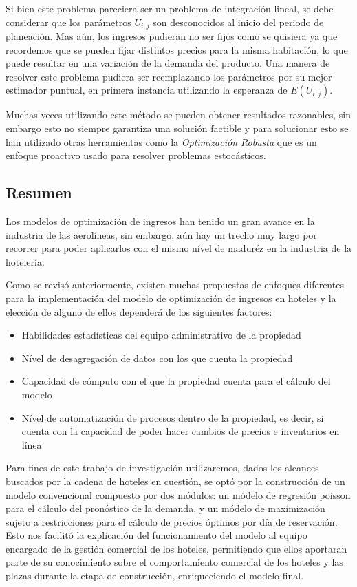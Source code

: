 {{{{{Si bien este problema pareciera ser un problema de integración lineal, se debe considerar que los parámetros $U_{i,j}$ son desconocidos al inicio del periodo de planeación. Mas aún, los ingresos pudieran no ser fijos como se quisiera ya que recordemos que se pueden fijar distintos precios para la misma habitación, lo que puede resultar en una variación de la demanda del producto. Una manera de resolver este problema pudiera ser reemplazando los parámetros por su mejor estimador puntual, en primera instancia utilizando la esperanza de $E(U_{i,j})$.

Muchas veces utilizando este método se pueden obtener resultados razonables, sin embargo esto no siempre garantiza una solución factible y para solucionar esto se han utilizado otras herramientas como la \emph{Optimización Robusta} que es un enfoque proactivo usado para resolver problemas estocásticos.

\subsection*{Resumen}

Los modelos de optimización de ingresos han tenido un gran avance en la industria de las aerolíneas, sin embargo, aún hay un trecho muy largo por recorrer para poder aplicarlos con el mismo nível de maduréz en la industria de la hotelería.

Como se revisó anteriormente, existen muchas propuestas de enfoques diferentes para la implementación del modelo de optimización de ingresos en hoteles y la elección de alguno de ellos dependerá de los siguientes factores:

\begin{itemize}
  \item Habilidades estadísticas del equipo administrativo de la propiedad
  \item Nível de desagregación de datos con los que cuenta la propiedad
  \item Capacidad de cómputo con el que la propiedad cuenta para el cálculo del modelo
  \item Nível de automatización de procesos dentro de la propiedad, es decir, si cuenta con la capacidad de poder hacer cambios de precios e inventarios en línea
\end{itemize}

Para fines de este trabajo de investigación utilizaremos, dados los alcances buscados por la cadena de hoteles en cuestión, se optó por la construcción de un modelo convencional compuesto por dos módulos: un módelo de regresión poisson para el cálculo del pronóstico de la demanda, y un módelo de maximización sujeto a restricciones para el cálculo de precios óptimos por día de reservación. Esto nos facilitó la explicación del funcionamiento del modelo al equipo encargado de la gestión comercial de los hoteles, permitiendo que ellos aportaran parte de su conocimiento sobre el comportamiento comercial de los hoteles y las plazas durante la etapa de construcción, enriqueciendo el modelo final.

}}}}}

